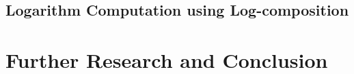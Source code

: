 \subsection{Logarithm Computation using Log-composition}





\section{Further Research and Conclusion}\label{ch:conclusions}

